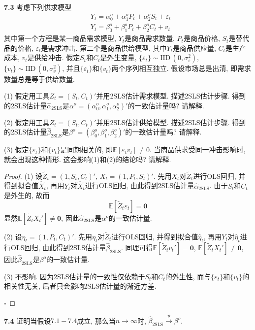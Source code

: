 \documentclass[cn,12pt,math=mtpro2,citestyle=gb7714-2015,bibstyle=gb7714-2015,twocol,mode=simple]{elegantbook}
\newcommand{\E}{\mathbb{E}}
\begin{document}
\textbf{7.3} 考虑下列供求模型
\begin{align*}
& Y_t=\alpha_0^o+\alpha_1^oP_t+\alpha_2^oS_t+\varepsilon_t \\
& Y_t=\beta_0^o+\beta_1^oP_t+\beta_2^oC_t+v_t
\end{align*}
其中第一个方程是某一商品需求模型, $Y_t$是商品需求数量, $P_t$是商品价格, $S_t$是替代品的价格, $\varepsilon_t$是需求冲击. 第二个是商品供给模型, 其中$Y_t$是商品供应量, $C_t$是生产成本, $v_t$是供给冲击. 假定$S_t$和$C_t$是外生变量, $\{\varepsilon_t\}\sim\text{IID}\,(0,\sigma^2_{\varepsilon})$, $\{v_t\}\sim\text{IID}\,(0,\sigma_v^2)$, 并且$\{\varepsilon_t\}$和$\{v_t\}$两个序列相互独立. 假设市场总是出清, 即需求数量总是等于供给数量.

(1) 假定用工具$Z_t=(S_t,C_t)'$并用2SLS估计需求模型. 描述2SLS估计步骤. 得到的2SLS估计量$\hat{\alpha}_{\text{2SLS}}$是$\alpha^o=(\alpha_0^o,\alpha_1^o,\alpha_2^o)'$的一致估计量吗? 请解释.

(2) 假定用工具$Z_t=(S_t,C_t)'$并用2SLS估计供给模型. 描述2SLS估计步骤. 得到的2SLS估计量$\hat{\beta}_{\text{2SLS}}$是$\beta^o=(\beta_0^o,\beta_1^o,\beta_2^o)'$的一致估计量吗? 请解释.

(3) 假定$\{\varepsilon_t\}$和$\{v_t\}$是同期相关的, 即$\E[\varepsilon_tv_t]\neq0$. 当商品供求受同一冲击影响时, 就会出现这种情形. 这会影响(1)和(2)的结论吗? 请解释.

\begin{proof}
  (1) 设$\tilde{Z}_t=(1,S_t,C_t)'$, $X_t=(1,P_t,S_t)'$. 先用$X_t$对$\tilde{Z}_t$进行OLS回归, 并得到拟合值$\hat{X}_t$, 再用$Y_t$对$\hat{X}_t$进行OLS回归, 由此得到2SLS估计量$\hat{\alpha}_{\text{2SLS}}$. 由于$S_t$和$C_t$是外生的, 故而
  $$\E[\tilde{Z}_t\varepsilon_t]=\mathbf{0}$$
  显然$\E[\tilde{Z}_tX_t']\neq\mathbf{0}$, 因此$\hat{\alpha}_{\text{2SLS}}$是$\alpha^o$的一致估计量.

  (2) 设$\eta_t=(1,P_t,C_t)'$. 先用$\eta_t$对$\tilde{Z}_t$进行OLS回归, 并得到拟合值$\hat{\eta}_t$, 再用$Y_t$对$\hat{\eta}_t$进行OLS回归, 由此得到2SLS估计量$\hat{\beta}_{\text{2SLS}}$. 同理可得$\E[\tilde{Z}_tv_t']=\mathbf{0}$, $\E[\tilde{Z}_tX_t']\neq\mathbf{0}$, 因此$\hat{\beta}_{\text{2SLS}}$是$\beta^o$的一致估计量.

  (3) 不影响. 因为2SLS估计量的一致性仅依赖于$S_t$和$C_t$的外生性, 而与$\{\varepsilon_t\}$和$\{v_t\}$的相关性无关, 后者只会影响2SLS估计量的渐近方差.

  $\square$
\end{proof}

\textbf{7.4} 证明当假设$7.1-7.4$成立, 那么当$n\to\infty$时, $\hat{\beta}_{\text{2SLS}}\xrightarrow{p}\beta^o$.
\end{document}

